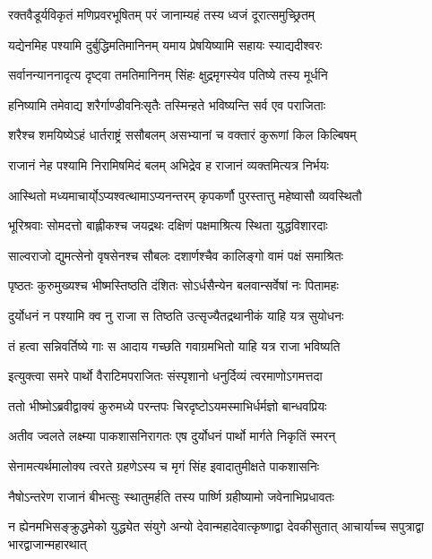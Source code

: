 \twolineshloka
{रक्तवैडूर्यविकृतं मणिप्रवरभूषितम्}
{परं जानाम्यहं तस्य ध्वजं दूरात्समुच्छ्रितम्}


\twolineshloka
{यद्येनमिह पश्यामि दुर्बुद्धिमतिमानिनम्}
{यमाय प्रेषयिष्यामि सहायः स्याद्यदीश्वरः}


\twolineshloka
{सर्वानन्याननादृत्य दृष्ट्वा तमतिमानिनम्}
{सिंहः क्षुद्रमृगस्येव पतिष्ये तस्य मूर्धनि}


\twolineshloka
{हनिष्यामि तमेवाद्य शरैर्गाण्डीवनिःसृतैः}
{तस्मिन्हते भविष्यन्ति सर्व एव पराजिताः}


\twolineshloka
{शरैश्च शमयिष्येऽहं धार्तराष्ट्रं ससौबलम्}
{असभ्यानां च वक्तारं कुरूणां किल किल्बिषम्}


\twolineshloka
{राजानं नेह पश्यामि निरामिषमिदं बलम्}
{अभिद्रेव ह राजानं व्यक्तमित्यत्र निर्भयः}


\twolineshloka
{आस्थितो मध्यमाचार्यो्ऽप्यश्वत्थामाऽप्यनन्तरम्}
{कृपकर्णौ पुरस्तात्तु महेष्वासौ व्यवस्थितौ}


\twolineshloka
{भूरिश्रवाः सोमदत्तो बाह्लीकश्च जयद्रथः}
{दक्षिणं पक्षमाश्रित्य स्थिता युद्धविशारदाः}


\twolineshloka
{साल्वराजो द्युमत्सेनो वृषसेनश्च सौबलः}
{दशार्णश्चैव कालिङ्गो वामं पक्षं समाश्रितः}


\twolineshloka
{पृष्ठतः कुरुमुख्यश्च भीष्मस्तिष्ठति दंशितः}
{सोऽर्धसैन्येन बलवान्सर्वेषां नः पितामहः}


\twolineshloka
{दुर्योधनं न पश्यामि क्व नु राजा स तिष्ठति}
{उत्सृज्यैतद्रथानीकं याहि यत्र सुयोधनः}


\twolineshloka
{तं हत्वा सन्निवर्तिष्ये गाः स आदाय गच्छति}
{गवाग्रमभितो याहि यत्र राजा भविष्यति}



\twolineshloka
{इत्युक्त्वा समरे पार्थो वैराटिमपराजितः}
{संस्पृशानो धनुर्दिव्यं त्वरमाणोऽगमत्तदा}


\twolineshloka
{ततो भीष्मोऽब्रवीद्वाक्यं कुरुमध्ये परन्तपः}
{चिरदृष्टोऽयमस्माभिर्धर्मज्ञो बान्धवप्रियः}



\twolineshloka
{अतीव ज्वलते लक्ष्म्या पाकशासनिरागतः}
{एष दुर्योधनं पार्थो मार्गते निकृतिं स्मरन्}


\twolineshloka
{सेनामत्यर्थमालोक्य त्वरते ग्रहणेऽस्य च}
{मृगं सिंह इवादातुमीक्षते पाकशासनिः}


\twolineshloka
{नैषोऽन्तरेण राजानं बीभत्सुः स्थातुमर्हति}
{तस्य पार्ष्णि ग्रहीष्यामो जवेनाभिप्रधावतः}


\threelineshloka
{न ह्येनमभिसङ्क्रुद्धमेको युद्ध्येत संयुगे}
{अन्यो देवान्महादेवात्कृष्णाद्वा देवकीसुतात्}
{आचार्याच्च सपुत्राद्वा भारद्वाजान्महारथात्}


